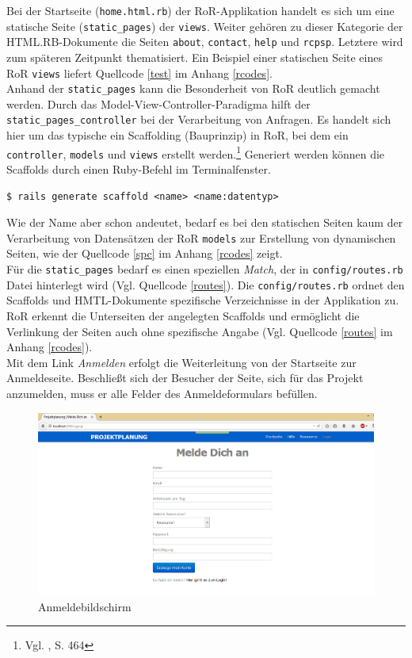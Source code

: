 \documentclass[a4paper,12pt,parskip,bibtotoc,liststotoc]{article}
\begin{document}
Bei der Startseite (\texttt{home.html.rb}) der RoR-Applikation handelt es sich um eine statische Seite (\texttt{static\_pages}) der \texttt{views}. Weiter gehören zu dieser Kategorie der HTML.RB-Dokumente die Seiten \texttt{about}, \texttt{contact}, \texttt{help} und \texttt{rcpsp}. Letztere wird zum späteren Zeitpunkt thematisiert. Ein Beispiel einer statischen Seite eines RoR \texttt{views} liefert Quellcode \ref{test} im Anhang \ref{rcodes}.\\

Anhand der \texttt{static\_pages} kann die Besonderheit von RoR deutlich gemacht werden. Durch das Model-View-Controller-Paradigma hilft der \texttt{static\_pages\_controller} bei der Verarbeitung von Anfragen. Es handelt sich hier um das typische ein Scaffolding (Bauprinzip) in RoR, bei dem ein \texttt{controller}, \texttt{models} und \texttt{views} erstellt werden.\footnote{Vgl. \cite{walter2008ruby}, S. 464} Generiert werden können die Scaffolds durch  einen Ruby-Befehl im Terminalfenster.
\begin{lstlisting}[style=Befehl]
$ rails generate scaffold <name> <name:datentyp> 
\end{lstlisting}

Wie der Name aber schon andeutet, bedarf es bei den statischen Seiten kaum der Verarbeitung von Datensätzen der RoR \texttt{models} zur Erstellung von dynamischen Seiten, wie der Quellcode \ref{spc} im Anhang \ref{rcodes} zeigt.\\

Für die \texttt{static\_pages} bedarf es einen speziellen \textit{Match}, der in \texttt{config/routes.rb} Datei hinterlegt wird (Vgl. Quellcode \ref{routes}). Die \texttt{config/routes.rb} ordnet den Scaffolds und HMTL-Dokumente spezifische Verzeichnisse in der Applikation zu. RoR erkennt die Unterseiten der angelegten Scaffolds und ermöglicht die Verlinkung der Seiten auch ohne spezifische Angabe (Vgl. Quellcode \ref{routes} im Anhang \ref{rcodes}).\\

Mit dem Link \textit{Anmelden} erfolgt die Weiterleitung von der Startseite zur Anmeldeseite. Beschließt sich der Besucher der Seite, sich für das Projekt anzumelden, muss er alle Felder des Anmeldeformulars befüllen.

\begin{figure}[h!]
  \begin{center}
    \includegraphics[width=120mm]{Bilder/Anmeldung.png}
    \caption{Anmeldebildschirm}  \label{Anm}
  \end{center}
\end{figure}
\end{document}
